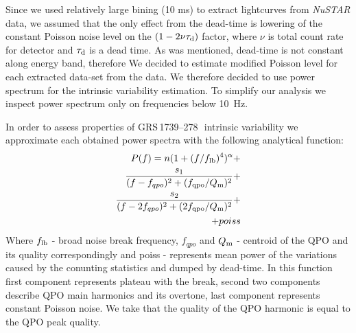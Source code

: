 \documentclass[a4paper,fleqn,usenatbib]{mnras}
\def\grs{{GRS\,1739--278\,}}
\begin{document}
Since we used relatively large bining (10 ms) to extract lightcurves from {\it NuSTAR} data, we assumed that the only effect from the dead-time is lowering of the constant Poisson noise level on the $(1 - 2\nu \tau_{\rm d})$ factor, where $\nu$ is total count rate for detector and $\tau_{\rm d}$ is a dead time. 
As was mentioned, dead-time is not constant along energy band, therefore We decided to estimate modified Poisson level for each extracted data-set from the data.
We therefore decided to use power spectrum for the intrinsic variability estimation.
To simplify our analysis we inspect power spectrum only on frequencies below 10~Hz.


In order to assess properties of \grs\ intrinsic variability we approximate each obtained power spectra with the following analytical function:
\begin{equation}
        \begin{split}
        P(f) = n (1 + (f/f_{\rm lb})^4)^{\alpha} + \\
        \frac{s_1}{(f - f_{qpo})^2 + (f_{\rm qpo}/Q_{\rm m})^2} +\\
        \frac{s_2}{(f - 2f_{qpo})^2 + (2f_{\rm qpo}/Q_{\rm m})^2} + \\
        + poiss
\end{split}
        \label{eq:complex_fit}
\end{equation}
Where $f_{\rm lb}$ - broad noise break frequency, $f_{qpo}$ and $Q_{\rm m}$ - centroid of the QPO and its quality correspondingly and poiss - represents mean power of the variations caused by the conunting statistics and dumped by dead-time.
In this function first component represents plateau with the break, second two components describe QPO main harmonics and its overtone, last component represents constant Poisson noise.
We take that the quality of the QPO harmonic is equal to the QPO peak quality.
\end{document}
